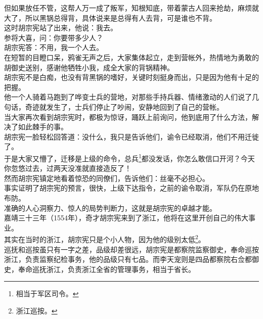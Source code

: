 \begin{multicols}{\theparacolNo}
但如果放任不管，这帮人万一成了叛军，知根知底，带着蒙古人回来抢劫，麻烦就大了，所以黑锅总得背，具体说来是总得有人去背，可是谁也不背。\\

这时胡宗宪站了出来，他说：我去。\\

参将大喜，问：你要带多少人？\\

胡宗宪答：不用，我一个人去。\\

在短暂的目瞪口呆，鸦雀无声之后，大家集体起立，走到营帐外，热情地为勇敢的胡御史送别，感谢他牺牲小我，成全大家的背锅精神。\\

胡宗宪不是白痴，也没有背黑锅的嗜好，关键时刻挺身而出，只是因为他有十足的把握。\\

他一个人骑着马跑到了哗变士兵的营地，对那些手持兵器、情绪激动的人们说了几句话，奇迹就发生了，士兵们停止了吵闹，安静地回到了自己的营帐。\\

当大家再次看到胡宗宪时，都极为惊讶，踊跃上前询问，他到底用了什么方法，解决了如此棘手的事。\\

胡宗宪一脸轻松回答道：没什么，我只是告诉他们，谕令已经取消，他们不用迁徙了。\\

于是大家又懵了，迁移是上级的命令，总兵\footnote{相当于军区司令。}都没发话，你怎么敢信口开河？今天你忽悠过去，过两天没准就直接造反了！\\

然而胡宗宪镇定地看着惊恐的同僚们，告诉他们：丝毫不必担心。\\

事实证明了胡宗宪的预言，很快，上级下达指令，之前的谕令取消，军队仍在原地布防。\\

准确的人心洞察力、惊人的局势判断力，这就是胡宗宪的卓越才能。\\

嘉靖三十三年（1554年），奇才胡宗宪来到了浙江，他将在这里开创自己的伟大事业。\\

其实在当时的浙江，胡宗宪只是个小人物，因为他的级别太低\footnote{浙江巡按。}。\\

巡抚和巡按虽只有一字之差，品级却差很远，胡宗宪是都察院监察御史，奉命巡按浙江，负责监察纪检事务，他的品级只有七品。而李天宠则是四品都察院右佥都御史，奉命巡抚浙江，负责浙江全省的管理事务，相当于省长。\\


\end{multicols}
